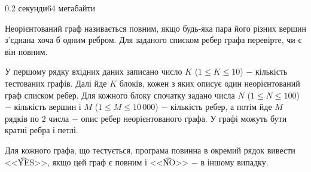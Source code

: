 \begin{problem}{}{}{}{0.2 секунди}{64 мегабайти}

Неорієнтований граф називається повним, якщо будь-яка пара його різних вершин з'єднана хоча б одним ребром. 
Для заданого списком ребер графа перевірте, чи є він повним.

\InputFile
У першому рядку вхідних даних записано число $K$ ($1 \le K \le 10$) $-$ кількість тестованих графів. 
Далі йде $K$ блоків, кожен з яких описує один неорієнтований граф списком ребер. 
Для кожного блоку спочатку задано числа $N$ ($1 \le N \le 100$) $-$ кількість вершин і $M$ ($1 \le M \le 10\,000$) $-$
кількість ребер, а потім йде $M$ рядків по $2$ числа $-$ опис ребер неорієнтованого графа. У графі можуть бути кратні ребра
і петлі.

\OutputFile
Для кожного графа, що тестується, програма повинна в окремий рядок вивести <<{\t{YES}}>>, якщо цей граф
є повним і <<{\t{NO}}>> $-$ в іншому випадку.

\Example

\begin{example}
%
\end{example}

\end{problem}


